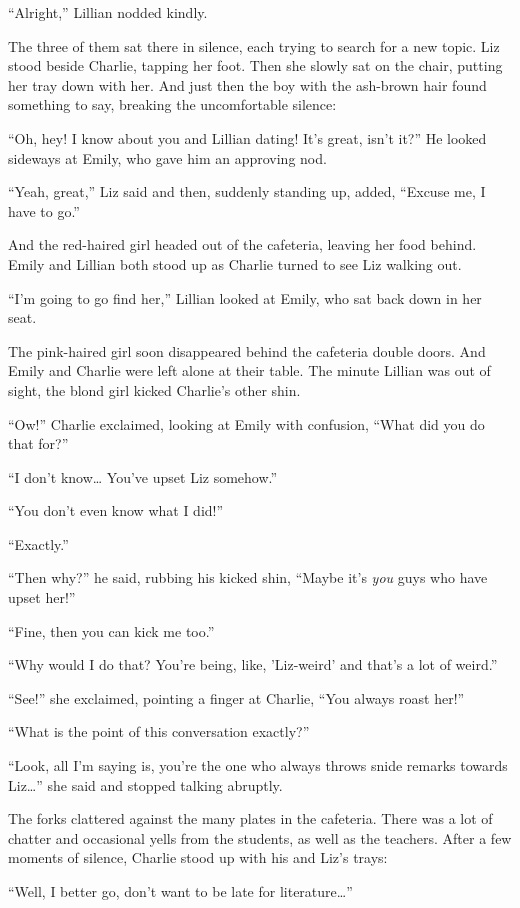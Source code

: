 “Alright,” Lillian nodded kindly.

The three of them sat there in silence, each trying to search for a new topic. Liz stood beside Charlie, tapping her foot. Then she slowly sat on the chair, putting her tray down with her. And just then the boy with the ash-brown hair found something to say, breaking the uncomfortable silence:

“Oh, hey! I know about you and Lillian dating! It's great, isn't it?” He looked sideways at Emily, who gave him an approving nod.

“Yeah, great,” Liz said and then, suddenly standing up, added, “Excuse me, I have to go.”

And the red-haired girl headed out of the cafeteria, leaving her food behind. Emily and Lillian both stood up as Charlie turned to see Liz walking out.

“I'm going to go find her,” Lillian looked at Emily, who sat back down in her seat.

The pink-haired girl soon disappeared behind the cafeteria double doors. And Emily and Charlie were left alone at their table. The minute Lillian was out of sight, the blond girl kicked Charlie's other shin.

“Ow!” Charlie exclaimed, looking at Emily with confusion, “What did you do that for?”

“I don't know… You've upset Liz somehow.”

“You don't even know what I did!”

“Exactly.”

“Then why?” he said, rubbing his kicked shin, “Maybe it's \textit{you} guys who have upset her!”

“Fine, then you can kick me too.”

“Why would I do that? You're being, like, 'Liz-weird' and that's a lot of weird.”

“See!” she exclaimed, pointing a finger at Charlie, “You always roast her!”

“What is the point of this conversation exactly?”

“Look, all I'm saying is, you're the one who always throws snide remarks towards Liz…” she said and stopped talking abruptly.

The forks clattered against the many plates in the cafeteria. There was a lot of chatter and occasional yells from the students, as well as the teachers. After a few moments of silence, Charlie stood up with his and Liz's trays:

“Well, I better go, don't want to be late for literature…”

